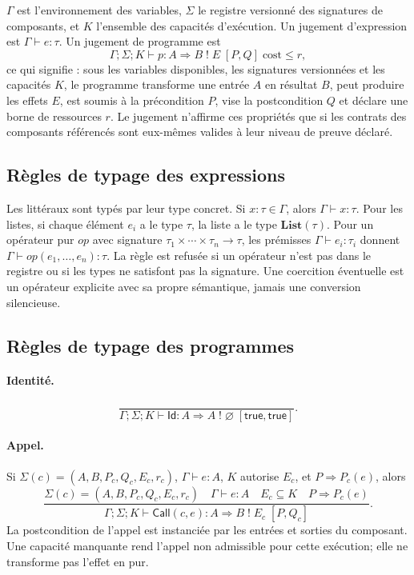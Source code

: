 \documentclass[11pt,a4paper]{article}
\theoremstyle{definition}
\theoremstyle{plain}
\theoremstyle{remark}
\begin{document}
$\Gamma$ est l'environnement des variables, $\Sigma$ le registre versionné des signatures de composants, et $K$ l'ensemble des capacités d'exécution. Un jugement d'expression est $\Gamma\vdash e:\tau$. Un jugement de programme est
\[
\Gamma;\Sigma;K\vdash p: A\Rightarrow B\;!\;E\;[P,Q]\;\text{cost}\leq r,
\]
ce qui signifie : sous les variables disponibles, les signatures versionnées et les capacités $K$, le programme transforme une entrée $A$ en résultat $B$, peut produire les effets $E$, est soumis à la précondition $P$, vise la postcondition $Q$ et déclare une borne de ressources $r$. Le jugement n'affirme ces propriétés que si les contrats des composants référencés sont eux-mêmes valides à leur niveau de preuve déclaré.

\subsection{Règles de typage des expressions}
Les littéraux sont typés par leur type concret. Si $x:\tau\in\Gamma$, alors $\Gamma\vdash x:\tau$. Pour les listes, si chaque élément $e_i$ a le type $\tau$, la liste a le type $\mathbf{List}(\tau)$. Pour un opérateur pur $op$ avec signature $\tau_1\times\cdots\times\tau_n\to\tau$, les prémisses $\Gamma\vdash e_i:\tau_i$ donnent $\Gamma\vdash op(e_1,\ldots,e_n):\tau$. La règle est refusée si un opérateur n'est pas dans le registre ou si les types ne satisfont pas la signature. Une coercition éventuelle est un opérateur explicite avec sa propre sémantique, jamais une conversion silencieuse.

\subsection{Règles de typage des programmes}
\paragraph{Identité.}
\[
\frac{}{\Gamma;\Sigma;K\vdash \mathsf{Id}:A\Rightarrow A\;!\;\varnothing\;[\mathsf{true},\mathsf{true}]}.
\]
\paragraph{Appel.} Si $\Sigma(c)=(A,B,P_c,Q_c,E_c,r_c)$, $\Gamma\vdash e:A$, $K$ autorise $E_c$, et $P\Rightarrow P_c(e)$, alors
\[
\frac{\Sigma(c)=(A,B,P_c,Q_c,E_c,r_c)\quad\Gamma\vdash e:A\quad E_c\subseteq K\quad P\Rightarrow P_c(e)}
{\Gamma;\Sigma;K\vdash \mathsf{Call}(c,e):A\Rightarrow B\;!\;E_c\;[P,Q_c]}.
\]
La postcondition de l'appel est instanciée par les entrées et sorties du composant. Une capacité manquante rend l'appel non admissible pour cette exécution; elle ne transforme pas l'effet en pur.
\end{document}
